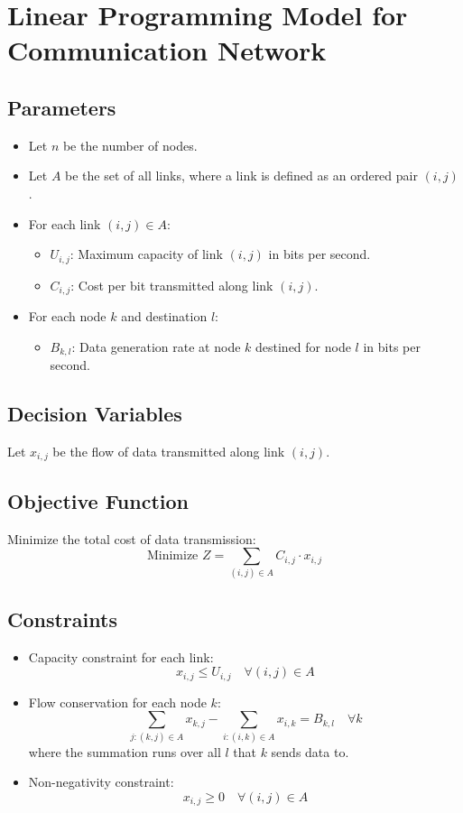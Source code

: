 \documentclass{article}
\begin{document}
\section*{Linear Programming Model for Communication Network}

\subsection*{Parameters}
\begin{itemize}
    \item Let \( n \) be the number of nodes.
    \item Let \( A \) be the set of all links, where a link is defined as an ordered pair \( (i, j) \).
    \item For each link \( (i, j) \in A \):
    \begin{itemize}
        \item \( U_{i,j} \): Maximum capacity of link \( (i, j) \) in bits per second.
        \item \( C_{i,j} \): Cost per bit transmitted along link \( (i, j) \).
    \end{itemize}
    \item For each node \( k \) and destination \( l \):
    \begin{itemize}
        \item \( B_{k,l} \): Data generation rate at node \( k \) destined for node \( l \) in bits per second.
    \end{itemize}
\end{itemize}

\subsection*{Decision Variables}
Let \( x_{i,j} \) be the flow of data transmitted along link \( (i, j) \).

\subsection*{Objective Function}
Minimize the total cost of data transmission:
\[
\text{Minimize } Z = \sum_{(i,j) \in A} C_{i,j} \cdot x_{i,j}
\]

\subsection*{Constraints}
\begin{itemize}
    \item Capacity constraint for each link:
    \[
    x_{i,j} \leq U_{i,j} \quad \forall (i,j) \in A
    \]
    
    \item Flow conservation for each node \( k \):
    \[
    \sum_{j: (k,j) \in A} x_{k,j} - \sum_{i: (i,k) \in A} x_{i,k} = B_{k,l} \quad \forall k 
    \]
    where the summation runs over all \( l \) that \( k \) sends data to.

    \item Non-negativity constraint:
    \[
    x_{i,j} \geq 0 \quad \forall (i,j) \in A
    \]
\end{itemize}
\end{document}
